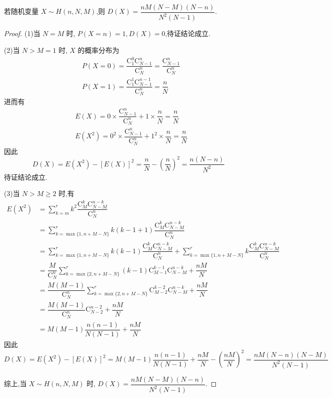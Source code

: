 \begin{conclusion}
    \indent 若随机变量 $X \sim H(n,N,M)$,则 $D(X) = \dfrac{nM(N-M)(N-n)}{N^2 (N-1)}$.
\end{conclusion}

\begin{proof}
    (1)当 $N=M$ 时, $P(X=n)=1, D(X)=0$,待证结论成立.

    (2)当 $N>M=1$ 时, $X$ 的概率分布为
    $$
    \begin{aligned}
        & P(X=0) = \dfrac{\mathrm{C}_1^0 \mathrm{C}_{N-1}^n}{\mathrm{C}_N^n} = \dfrac{\mathrm{C}_{N-1}^n}{\mathrm{C}_N^n} \\
        & P(X=1) = \dfrac{\mathrm{C}_1^1 \mathrm{C}_{N-1}^{n-1}}{\mathrm{C}_N^n} = \dfrac{n}{N}
    \end{aligned}
    $$
    进而有
    $$
    \begin{aligned}
        & E(X) = 0 \times \dfrac{\mathrm{C}_{N-1}^n}{\mathrm{C}_N^n} + 1 \times \dfrac{n}{N} = \dfrac{n}{N} \\
        & E(X^2) = 0^2 \times \dfrac{\mathrm{C}_{N-1}^n}{\mathrm{C}_N^n} + 1^2 \times \dfrac{n}{N} = \dfrac{n}{N}
    \end{aligned}
    $$
    因此
    $$
    D(X) = E(X^2) - [E(X)]^2 = \dfrac{n}{N} - \left( \dfrac{n}{N} \right)^2 = \dfrac{n(N-n)}{N^2}
    $$
    待证结论成立.
    
    (3)当 $N > M \geqslant 2$ 时,有
    $$
    \begin{aligned}
        E(X^2) &= \sum_{k=m}^{r} k^2 \dfrac{\mathrm{C}_M^k \mathrm{C}_{N-M}^{n-k}}{\mathrm{C}_N^n} \\
        &= \sum_{k=\max\{ 1, n+M-N \}}^{r} k(k-1+1) \dfrac{\mathrm{C}_M^k \mathrm{C}_{N-M}^{n-k}}{\mathrm{C}_N^n} \\
        &= \sum_{k=\max\{ 1, n+M-N \}}^{r} k(k-1) \dfrac{\mathrm{C}_M^k \mathrm{C}_{N-M}^{n-k}}{\mathrm{C}_N^n} + \sum_{k=\max\{ 1, n+M-N \}}^{r} k \dfrac{\mathrm{C}_M^k \mathrm{C}_{N-M}^{n-k}}{\mathrm{C}_N^n} \\
        &= \dfrac{M}{\mathrm{C}_N^n} \sum_{k=\max\{ 2, n+M-N \}}^{r} (k-1) \mathrm{C}_{M-1}^{k-1} \mathrm{C}_{N-M}^{n-k} + \dfrac{nM}{N} \\
        &= \dfrac{M(M-1)}{\mathrm{C}_N^n} \sum_{k=\max\{ 2, n+M-N \}}^{r} \mathrm{C}_{M-2}^{k-2} \mathrm{C}_{N-M}^{n-k} + \dfrac{nM}{N} \\
        &= \dfrac{M(M-1)}{\mathrm{C}_N^n} \mathrm{C}_{N-2}^{n-2} + \dfrac{nM}{N} \\
        &= M(M-1) \dfrac{n(n-1)}{N(N-1)} + \dfrac{nM}{N}
    \end{aligned}
    $$
    因此
    $$
    D(X) = E(X^2) - [E(X)]^2 = M(M-1) \dfrac{n(n-1)}{N(N-1)} + \dfrac{nM}{N} - \left( \dfrac{nM}{N} \right)^2 = \dfrac{nM(N-n)(N-M)}{N^2 (N-1)}
    $$

    综上,当 $X \sim H(n,N,M)$ 时, $D(X) = \dfrac{nM(N-M)(N-n)}{N^2 (N-1)}$.
\end{proof}

